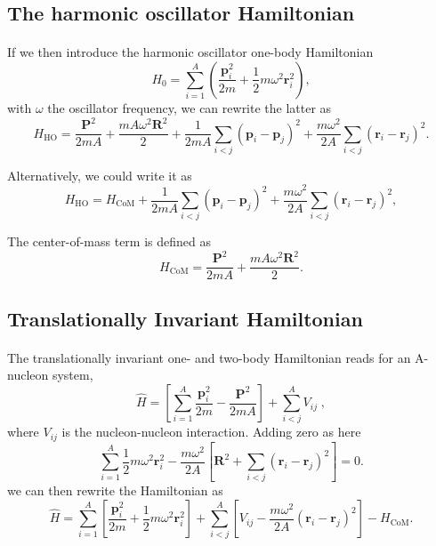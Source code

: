 \documentclass[%
twoside,                 %
final,                   %
10pt]{article}
\begin{document}
\subsection*{The harmonic oscillator Hamiltonian}

\paragraph{}
 If we then introduce the harmonic oscillator one-body Hamiltonian
\[
      H_0= \sum_{i=1}^A\left(\frac{\bm{p}_i^2}{2m}+
	   \frac{1}{2}m\omega^2\bm{r}_i^2\right),
 \]
 with $\omega$ the oscillator frequency,
 we can rewrite the latter as 
 \[
      H_{\mathrm{HO}}= \frac{\bm{P}^2}{2mA}+\frac{mA\omega^2\bm{R}^2}{2}
	    +\frac{1}{2mA}\sum_{i < j}(\bm{p}_i-\bm{p}_j)^2
	    +\frac{m\omega^2}{2A}\sum_{i < j}(\bm{r}_i-\bm{r}_j)^2.
     \label{eq:obho}
 \]

Alternatively, we could write it as	
\[
 H_{\mathrm{HO}}= H_{\mathrm{CoM}}+\frac{1}{2mA}\sum_{i < j}(\bm{p}_i-\bm{p}_j)^2
	    +\frac{m\omega^2}{2A}\sum_{i < j}(\bm{r}_i-\bm{r}_j)^2,
 \]

The center-of-mass term is defined as
 \[
      H_{\mathrm{CoM}}= \frac{\bm{P}^2}{2mA}+\frac{mA\omega^2\bm{R}^2}{2}.
 \]




\subsection*{Translationally Invariant Hamiltonian}

\paragraph{}
 The translationally invariant one- and two-body  Hamiltonian reads for an A-nucleon system,
 \[
\label{eq:ham}
\hat{H}=\left[\sum_{i=1}^A\frac{\bm{p}_i^2}{2m} -\frac{\bm{P}^2}{2mA}\right] +\sum_{i < j}^A V_{ij} \; ,
 \]
 where $V_{ij}$ is the nucleon-nucleon interaction. Adding zero as here
\[
 \sum_{i=1}^A\frac{1}{2}m\omega^2\bm{r}_i^2-
 \frac{m\omega^2}{2A}\left[\bm{R}^2+\sum_{i < j}(\bm{r}_i-\bm{r}_j)^2\right]=0.
 \]
we can then rewrite the Hamiltonian as 
\[
 \hat{H}=\sum_{i=1}^A \left[ \frac{\bm{p}_i^2}{2m}
 +\frac{1}{2}m\omega^2 \bm{r}^2_i
 \right] + \sum_{i < j}^A \left[ V_{ij}-\frac{m\omega^2}{2A}
 (\bm{r}_i-\bm{r}_j)^2
 \right]-H_{\mathrm{CoM}}.
 \]
\end{document}
